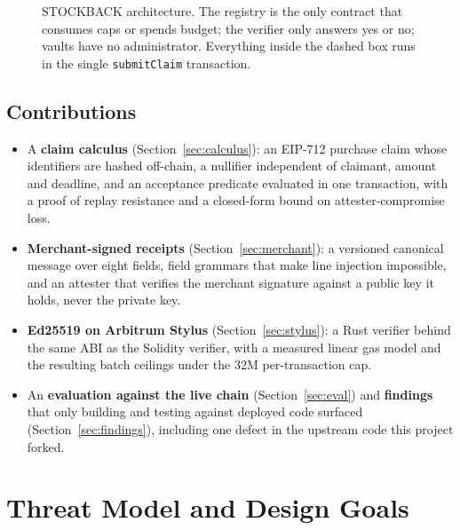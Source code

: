 \documentclass[10.5pt,letterpaper]{article}
\theoremstyle{definition}
\theoremstyle{remark}
\newcommand{\ttt}[1]{\texttt{#1}}
\begin{document}
\begin{figure}[t]
\caption{STOCKBACK architecture. The registry is the only contract that consumes caps or spends budget; the verifier
only answers yes or no; vaults have no administrator. Everything inside the dashed box runs in the single
\ttt{submitClaim} transaction.}
\label{fig:arch}
\end{figure}

\subsection{Contributions}
\begin{itemize}
  \item A \textbf{claim calculus} (Section~\ref{sec:calculus}): an EIP-712 purchase claim whose identifiers are hashed off-chain,
        a nullifier independent of claimant, amount and deadline, and an acceptance predicate evaluated in one
        transaction, with a proof of replay resistance and a closed-form bound on attester-compromise loss.
  \item \textbf{Merchant-signed receipts} (Section~\ref{sec:merchant}): a versioned canonical message over eight fields, field grammars
        that make line injection impossible, and an attester that verifies the merchant signature against a public
        key it holds, never the private key.
  \item \textbf{Ed25519 on Arbitrum Stylus} (Section~\ref{sec:stylus}): a Rust verifier behind the same ABI as the Solidity verifier,
        with a measured linear gas model and the resulting batch ceilings under the 32M per-transaction cap.
  \item An \textbf{evaluation against the live chain} (Section~\ref{sec:eval}) and \textbf{findings} that only building and testing
        against deployed code surfaced (Section~\ref{sec:findings}), including one defect in the upstream code this project forked.
\end{itemize}

\section{Threat Model and Design Goals}\label{sec:threat}
\end{document}
